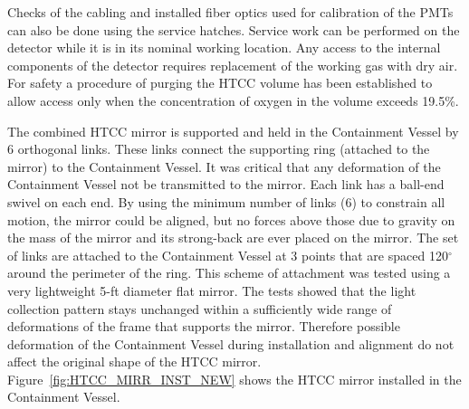 Checks of the cabling and installed fiber optics used for calibration of the PMTs can also be done using the
service hatches. Service work can be performed on the detector while it is in its nominal working location. Any
access to the internal components of the detector requires replacement of the working gas with dry air. For
safety a procedure of purging the HTCC volume has been established to allow access only when the concentration
of oxygen in the volume exceeds 19.5\%.

The combined HTCC mirror is supported and held in the Containment Vessel by 6 orthogonal links. These links
connect the supporting ring (attached to the mirror) to the Containment Vessel. It was critical that any
deformation of the Containment Vessel not be transmitted to the mirror. Each link has a ball-end swivel on each
end. By using the minimum number of links (6) to constrain all motion, the mirror could be aligned, but no forces
above those due to gravity on the mass of the mirror and its strong-back are ever placed on the mirror. The set
of links are attached to the Containment Vessel at 3 points that are spaced 120$^\circ$ around the perimeter
of the ring. This scheme of attachment was tested using a very lightweight 5-ft diameter flat mirror. The tests
showed that the light collection pattern stays unchanged within a sufficiently wide range of deformations of the
frame that supports the mirror. Therefore possible deformation of the Containment Vessel during installation
and alignment do not affect the original shape of the HTCC mirror. Figure~\ref{fig:HTCC_MIRR_INST_NEW}
shows the HTCC mirror installed in the Containment Vessel.

